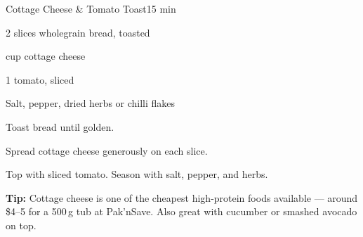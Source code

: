 \begin{recipebox}{Cottage Cheese \& Tomato Toast}{1}{5 min}
\begin{ingredients}
  \item 2 slices wholegrain bread, toasted
  \item \textonehalf{} cup cottage cheese
  \item 1 tomato, sliced
  \item Salt, pepper, dried herbs or chilli flakes
\end{ingredients}

\begin{method}
  \item Toast bread until golden.
  \item Spread cottage cheese generously on each slice.
  \item Top with sliced tomato. Season with salt, pepper, and herbs.
\end{method}

\begin{notelist}
  \item \textbf{Tip:} Cottage cheese is one of the cheapest high-protein foods available --- around \$4--5 for a 500\,g tub at Pak'nSave. Also great with cucumber or smashed avocado on top.
\end{notelist}
\end{recipebox}
